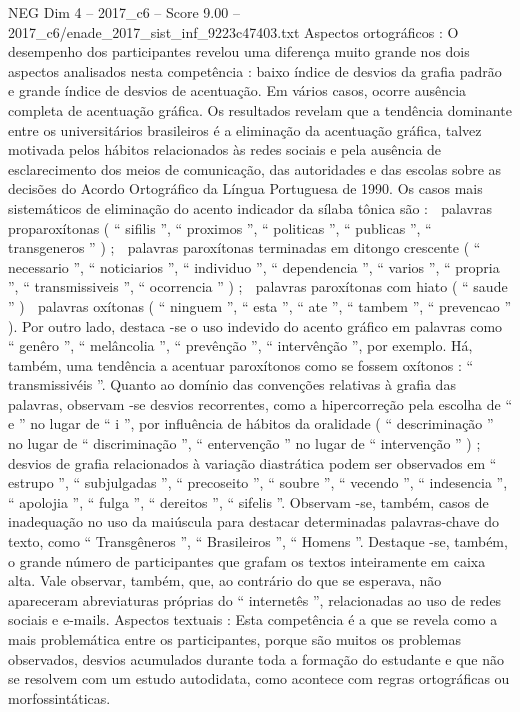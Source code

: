 \begin{textsample}{NEG Dim 4 – 2017\_c6 – Score 9.00 – 2017\_c6/enade\_2017\_sist\_inf\_9223c47403.txt}
Aspectos ortográficos : O desempenho dos participantes revelou uma diferença muito grande nos dois aspectos analisados nesta competência : baixo índice de desvios da grafia padrão e grande índice de desvios de acentuação.
Em vários casos, ocorre ausência completa de acentuação gráfica.
Os resultados revelam que a tendência dominante entre os universitários brasileiros é a eliminação da acentuação gráfica, talvez motivada pelos hábitos relacionados às redes sociais e pela ausência de esclarecimento dos meios de comunicação, das autoridades e das escolas sobre as decisões do Acordo Ortográfico da Língua Portuguesa de 1990.
Os casos mais sistemáticos de eliminação do acento indicador da sílaba tônica são :  palavras proparoxítonas ( “ sifilis ”, “ proximos ”, “ politicas ”, “ publicas ”, “ transgeneros ” ) ;  palavras paroxítonas terminadas em ditongo crescente ( “ necessario ”, “ noticiarios ”, “ individuo ”, “ dependencia ”, “ varios ”, “ propria ”, “ transmissiveis ”, “ ocorrencia ” ) ;  palavras paroxítonas com hiato ( “ saude ” )  palavras oxítonas ( “ ninguem ”, “ esta ”, “ ate ”, “ tambem ”, “ prevencao ” ).
Por outro lado, destaca -se o uso indevido do acento gráfico em palavras como “ genêro ”, “ melâncolia ”, “ prevênção ”, “ intervênção ”, por exemplo.
Há, também, uma tendência a acentuar paroxítonos como se fossem oxítonos : “ transmissivéis ”.
Quanto ao domínio das convenções relativas à grafia das palavras, observam -se desvios recorrentes, como a hipercorreção pela escolha de “ e ” no lugar de “ i ”, por influência de hábitos da oralidade ( “ descriminação ” no lugar de “ discriminação ”, “ entervenção ” no lugar de “ intervenção ” ) ; desvios de grafia relacionados à variação diastrática podem ser observados em “ estrupo ”, “ subjulgadas ”, “ precoseito ”, “ soubre ”, “ vecendo ”, “ indesencia ”, “ apolojia ”, “ fulga ”, “ dereitos ”, “ sifelis ”.
Observam -se, também, casos de inadequação no uso da maiúscula para destacar determinadas palavras-chave do texto, como “ Transgêneros ”, “ Brasileiros ”, “ Homens ”.
Destaque -se, também, o grande número de participantes que grafam os textos inteiramente em caixa alta.
Vale observar, também, que, ao contrário do que se esperava, não apareceram abreviaturas próprias do “ internetês ”, relacionadas ao uso de redes sociais e e-mails.
Aspectos textuais : Esta competência é a que se revela como a mais problemática entre os participantes, porque são muitos os problemas observados, desvios acumulados durante toda a formação do estudante e que não se resolvem com um estudo autodidata, como acontece com regras ortográficas ou morfossintáticas.

\end{textsample}
